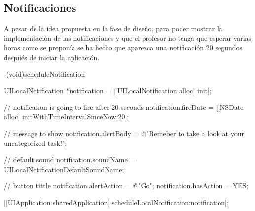 \documentclass[parskip=half*]{scrartcl}
\begin{document}
\subsection{Notificaciones}

A pesar de la idea propuesta en la fase de dise\~no, para poder mostrar la implementaci\'on de las notificaciones y que el profesor no tenga que esperar varias horas como se propon\'ia se ha hecho que aparezca una notificaci\'on 20 segundos despu\'es de iniciar la aplicaci\'on.

\begin{verbatimtab}
-(void)scheduleNotification
{
    UILocalNotification *notification = [[UILocalNotification alloc] init];
    
    // notification is going to fire after 20 seconds
    notification.fireDate = [[NSDate alloc] initWithTimeIntervalSinceNow:20];
    
    // message to show
    notification.alertBody = @"Remeber to take a look at your uncategorized task!";
    
    // default sound
    notification.soundName = UILocalNotificationDefaultSoundName;
    
    // button tittle
    notification.alertAction = @"Go";
    notification.hasAction = YES;
    
    [[UIApplication sharedApplication] scheduleLocalNotification:notification];
}
\end{verbatimtab}
\end{document}
